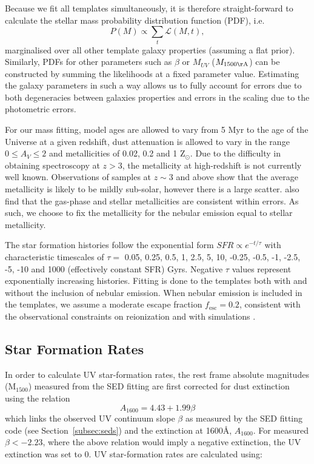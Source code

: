 Because we fit all templates simultaneously, it is therefore straight-forward to calculate the stellar mass probability distribution function (PDF), i.e. 
\begin{equation}
  P(M) \propto \sum_{t} \mathcal{L}(M,t),
\end{equation}
marginalised over all other template galaxy properties (assuming a flat prior). Similarly, PDFs for other parameters such as $\beta$ or $M_{UV}$ ($M_{1500\rm{\AA}}$) can be constructed by summing the likelihoods at a fixed parameter value. Estimating the galaxy parameters in such a way allows us to fully account for errors due to both degeneracies between galaxies properties and errors in the scaling due to the photometric errors.

For our mass fitting, model ages are allowed to vary from 5 Myr to the age of the Universe at a given redshift, dust attenuation is allowed to vary in the range $0 \le A_{V} \le 2$ and metallicities of 0.02, 0.2 and 1 Z$_{\odot}$. Due to the difficulty in obtaining spectroscopy at $z > 3$, the metallicity at high-redshift is not currently well known. Observations of samples at $z \sim 3$ and above \citep{Shapley:2003wi,2008ASPC..396..409M,2012A&A...539A.136S,Jones:2012kn} show that the average metallicity is likely to be mildly sub-solar, however there is a large scatter. \citet{2012A&A...539A.136S} also find that the gas-phase and stellar metallicities are consistent within errors. As such, we choose to fix the metallicity for the nebular emission equal to stellar metallicity.

The star formation histories follow the exponential form $SFR \propto e^{-t/\tau}$ with characteristic timescales of $\tau = $ 0.05, 0.25, 0.5, 1, 2.5, 5, 10, -0.25, -0.5, -1, -2.5, -5, -10 and 1000 (effectively constant SFR) Gyrs. Negative $\tau$ values represent exponentially increasing histories. Fitting is done to the templates both with and without the inclusion of nebular emission. When nebular emission is included in the templates, we assume a moderate escape fraction $f_{\text{esc}} = 0.2$, consistent with the observational constraints on reionization and with simulations \citep{Yajima:2010fb,Fernandez:2011cw,Finkelstein:2012hr,Robertson:2013ji}.

\subsection{Star Formation Rates}\label{sec:SFR}
In order to calculate UV star-formation rates, the rest frame absolute magnitudes (M$_{1500}$) measured from the SED fitting are first corrected for dust extinction using the \citet{Meurer:1999jm} relation
\begin{equation}
A_{1600} = 4.43 + 1.99\beta
\end{equation}
which links the observed UV continuum slope $\beta$ as measured by the SED fitting code (see Section~\ref{subsec:seds}) and the extinction at 1600\AA, $A_{1600}$. For measured $\beta < - 2.23$, where the above relation would imply a negative extinction, the UV extinction was set to 0. UV star-formation rates are calculated using: 

